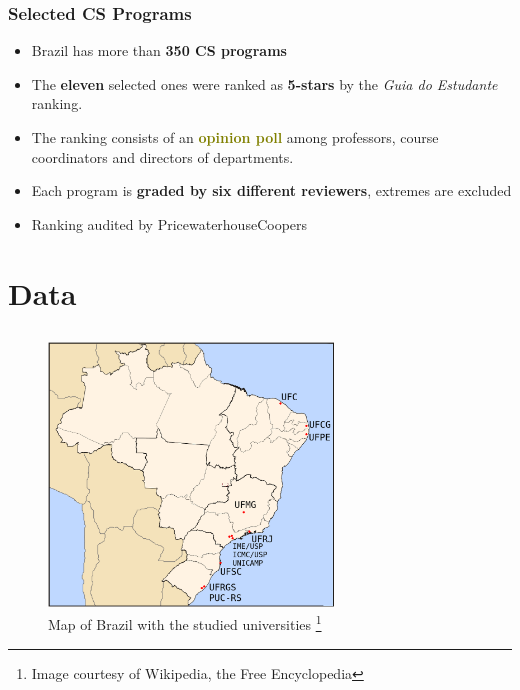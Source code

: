 \documentclass{beamer}
\begin{document}
\begin{frame}
\frametitle{Selected CS Programs}
\begin{itemize}
	\item Brazil has more than \textbf{\textcolor{n_red}{350 CS programs}}
	\item The \textbf{\textcolor{n_green}{eleven}} selected ones were ranked as 
	\textbf{\textcolor{n_violet}{5-stars}} by the \emph{Guia do
	Estudante} ranking. 
	\item The ranking consists of an \textbf{\textcolor{olive}{opinion poll}} among professors, course
	coordinators and directors of departments.
	\item Each program is \textbf{\textcolor{RawSienna}{graded by six different reviewers}}, extremes are excluded
	\item Ranking audited by PricewaterhouseCoopers
\end{itemize}
\end{frame}

\section{Data}
\subsection{}

\begin{frame}
\begin{figure}[htp]
\begin{center}
  \includegraphics[height=7cm]{brazil_map.png}
  \caption[map]{Map of Brazil with the studied universities \footnote{\tiny
  Image courtesy of Wikipedia, the Free Encyclopedia}}
\end{center}
\end{figure}

\end{frame}
\end{document}
